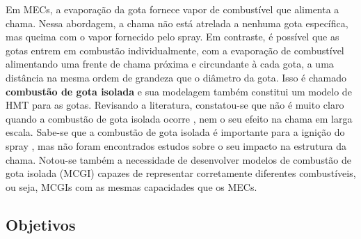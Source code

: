 Em MECs, a evaporação da gota fornece vapor de combustível que alimenta a chama.
Nessa abordagem, a chama não está atrelada a nenhuma gota específica, mas queima com o vapor fornecido pelo spray. 
Em contraste, é possível que as gotas entrem em combustão individualmente, com a evaporação de combustível alimentando uma frente de chama próxima e circundante à cada gota, a uma distância na mesma ordem de grandeza que o diâmetro da gota.
Isso é chamado \textbf{combustão de gota isolada} e sua modelagem também constitui um modelo de HMT para as gotas.
Revisando a literatura, constatou-se que não é muito claro quando a combustão de gota isolada ocorre \cite[p. 8]{JennyB2012}, nem o seu efeito na chama em larga escala.
Sabe-se que a combustão de gota isolada é importante para a ignição do spray \cite{AggarwalS2014}, mas não foram encontrados estudos sobre o seu impacto na estrutura da chama.
Notou-se também a necessidade de desenvolver modelos de combustão de gota isolada (MCGI) capazes de representar corretamente diferentes combustíveis, ou seja, MCGIs com as mesmas capacidades que os MECs.


\subsection{Objetivos} \label{sec:objetivos}

